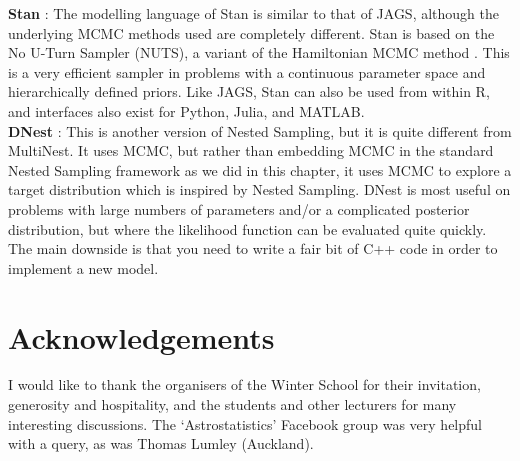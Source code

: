 {\bf Stan} \citep{stan}: The modelling language of Stan is similar to that of
JAGS, although the underlying MCMC methods used are completely different. Stan
is based on the No U-Turn Sampler (NUTS), a variant of the Hamiltonian MCMC
method \citep{hamiltonian}. This is a very efficient sampler in problems with
a continuous parameter space and hierarchically defined priors. Like JAGS,
Stan can also be used from within R, and interfaces also exist for Python,
Julia, and MATLAB.\\

{\bf DNest} \citep{dnest}: This is another version of Nested Sampling, but it
is quite different from MultiNest. It uses MCMC, but rather than embedding
MCMC in the standard Nested Sampling framework as we did in this chapter, it
uses MCMC to explore a target distribution which is inspired by Nested Sampling.
DNest is most useful on problems with large numbers of parameters and/or a
complicated posterior distribution, but where the
likelihood function can be evaluated quite quickly. The main downside is that
you need to write a fair bit of C++ code in order to implement a new model.

\section{Acknowledgements}
I would like to thank the organisers of the Winter School for their invitation,
generosity and hospitality, and the students and other lecturers for many
interesting discussions. The `Astrostatistics' Facebook group was very helpful
with a query, as was Thomas Lumley (Auckland).

